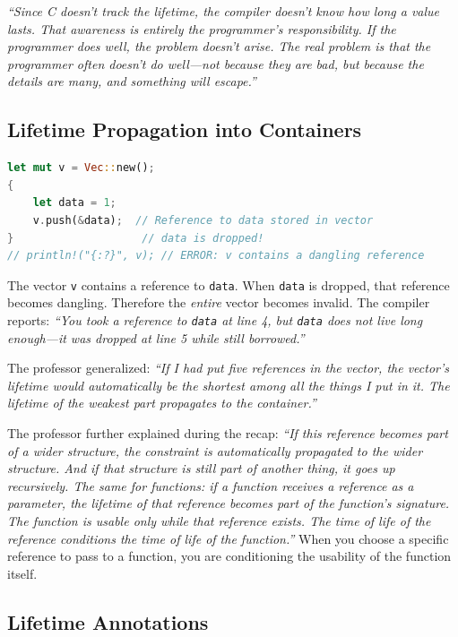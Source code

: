\emph{``Since C doesn't track the lifetime, the compiler doesn't know how long a value lasts. That awareness is entirely the programmer's responsibility. If the programmer does well, the problem doesn't arise. The real problem is that the programmer often doesn't do well---not because they are bad, but because the details are many, and something will escape.''}

\subsection{Lifetime Propagation into Containers}

\begin{lstlisting}[language=Rust]
let mut v = Vec::new();
{
    let data = 1;
    v.push(&data);  // Reference to data stored in vector
}                    // data is dropped!
// println!("{:?}", v); // ERROR: v contains a dangling reference
\end{lstlisting}

The vector \texttt{v} contains a reference to \texttt{data}. When \texttt{data} is dropped, that reference becomes dangling. Therefore the \emph{entire} vector becomes invalid. The compiler reports: \emph{``You took a reference to \texttt{data} at line 4, but \texttt{data} does not live long enough---it was dropped at line 5 while still borrowed.''}

The professor generalized: \emph{``If I had put five references in the vector, the vector's lifetime would automatically be the shortest among all the things I put in it. The lifetime of the weakest part propagates to the container.''}

The professor further explained during the recap: \emph{``If this reference becomes part of a wider structure, the constraint is automatically propagated to the wider structure. And if that structure is still part of another thing, it goes up recursively. The same for functions: if a function receives a reference as a parameter, the lifetime of that reference becomes part of the function's signature. The function is usable only while that reference exists. The time of life of the reference conditions the time of life of the function.''} When you choose a specific reference to pass to a function, you are conditioning the usability of the function itself.

\subsection{Lifetime Annotations}

